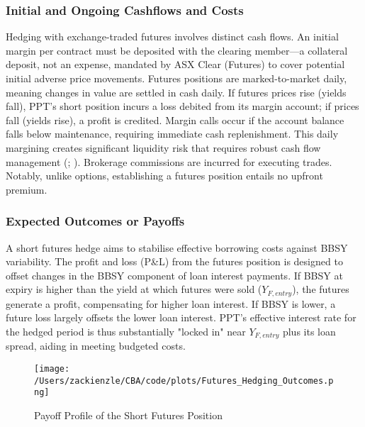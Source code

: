 \documentclass[11pt, a4paper, british]{article}
\begin{document}
\subsubsection{Initial and Ongoing Cashflows and Costs}
Hedging with exchange-traded futures involves distinct cash flows. An initial margin per contract must be deposited with the clearing member—a collateral deposit, not an expense, mandated by ASX Clear (Futures) to cover potential initial adverse price movements. Futures positions are marked-to-market daily, meaning changes in value are settled in cash daily. If futures prices rise (yields fall), PPT's short position incurs a loss debited from its margin account; if prices fall (yields rise), a profit is credited. Margin calls occur if the account balance falls below maintenance, requiring immediate cash replenishment. This daily margining creates significant liquidity risk that requires robust cash flow management (\cite{fg}; \cite{bp}). Brokerage commissions are incurred for executing trades. Notably, unlike options, establishing a futures position entails no upfront premium.

\subsubsection{Expected Outcomes or Payoffs}
A short futures hedge aims to stabilise effective borrowing costs against BBSY variability. The profit and loss (P\&L) from the futures position is designed to offset changes in the BBSY component of loan interest payments. If BBSY at expiry is higher than the yield at which futures were sold ($Y_{F, entry}$), the futures generate a profit, compensating for higher loan interest. If BBSY is lower, a future loss largely offsets the lower loan interest. PPT's effective interest rate for the hedged period is thus substantially "locked in" near $Y_{F, entry}$ plus its loan spread, aiding in meeting budgeted costs.

\begin{figure}[H]
 \centering
 \texttt{[image: /Users/zackienzle/CBA/code/plots/Futures\_Hedging\_Outcomes.png]} 
 \caption{Payoff Profile of the Short Futures Position}
    \label{fig:ShortFuturesPayoff}
\end{figure}
\end{document}
